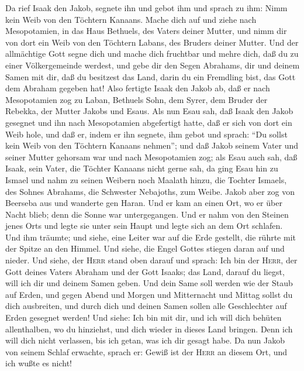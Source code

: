  Da rief Isaak den Jakob, segnete ihn und gebot ihm und
sprach zu ihm: Nimm kein Weib von den Töchtern Kanaans. 
Mache dich auf und ziehe nach Mesopotamien, in das Haus Bethuels, des
Vaters deiner Mutter, und nimm dir von dort ein Weib von den Töchtern
Labans, des Bruders deiner Mutter.  Und der allmächtige
Gott segne dich und mache dich fruchtbar und mehre dich, daß du zu einer
Völkergemeinde werdest,  und gebe dir den Segen Abrahams,
dir und deinem Samen mit dir, daß du besitzest das Land, darin du ein
Fremdling bist, das Gott dem Abraham gegeben hat!  Also
fertigte Isaak den Jakob ab, daß er nach Mesopotamien zog zu Laban,
Bethuels Sohn, dem Syrer, dem Bruder der Rebekka, der Mutter Jakobs und
Esaus.  Als nun Esau sah, daß Isaak den Jakob gesegnet und
ihn nach Mesopotamien abgefertigt hatte, daß er sich von dort ein Weib
hole, und daß er, indem er ihn segnete, ihm gebot und sprach: ``Du
sollst kein Weib von den Töchtern Kanaans nehmen'';  und
daß Jakob seinem Vater und seiner Mutter gehorsam war und nach
Mesopotamien zog;  als Esau auch sah, daß Isaak, sein
Vater, die Töchter Kanaans nicht gerne sah,  da ging Esau
hin zu Ismael und nahm zu seinen Weibern noch Maalath hinzu, die Tochter
Ismaels, des Sohnes Abrahams, die Schwester Nebajoths, zum Weibe.
 Jakob aber zog von Beerseba aus und wanderte gen Haran.
 Und er kam an einen Ort, wo er über Nacht blieb; denn
die Sonne war untergegangen. Und er nahm von den Steinen jenes Orts und
legte sie unter sein Haupt und legte sich an dem Ort schlafen.
 Und ihm träumte; und siehe, eine Leiter war auf die Erde
gestellt, die rührte mit der Spitze an den Himmel. Und siehe, die Engel
Gottes stiegen daran auf und nieder.  Und siehe, der
\textsc{Herr} stand oben darauf und sprach: Ich bin der \textsc{Herr},
der Gott deines Vaters Abraham und der Gott Isaaks; das Land, darauf du
liegst, will ich dir und deinem Samen geben.  Und dein
Same soll werden wie der Staub auf Erden, und gegen Abend und Morgen und
Mitternacht und Mittag sollst du dich ausbreiten, und durch dich und
deinen Samen sollen alle Geschlechter auf Erden gesegnet werden!
 Und siehe: Ich bin mit dir, und ich will dich behüten
allenthalben, wo du hinziehst, und dich wieder in dieses Land bringen.
Denn ich will dich nicht verlassen, bis ich getan, was ich dir gesagt
habe.  Da nun Jakob von seinem Schlaf erwachte, sprach
er: Gewiß ist der \textsc{Herr} an diesem Ort, und ich wußte es nicht!
